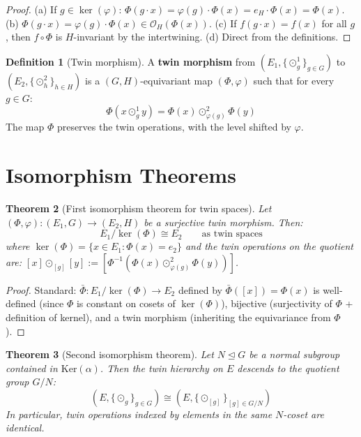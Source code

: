 \documentclass[12pt]{article}
\theoremstyle{plain}
\newtheorem{theorem}{Theorem}[section]
\theoremstyle{definition}
\newtheorem{definition}[theorem]{Definition}
\theoremstyle{remark}
\newcommand{\Ker}{\mathrm{Ker}}
\begin{document}
\begin{proof}
(a) If $g \in \ker(\varphi)$: $\Phi(g \cdot x) = \varphi(g) \cdot \Phi(x) = e_H \cdot \Phi(x) = \Phi(x)$.
(b) $\Phi(g \cdot x) = \varphi(g) \cdot \Phi(x) \in \mathcal{O}_H(\Phi(x))$.
(c) If $f(g \cdot x) = f(x)$ for all $g$, then $f \circ \Phi$ is $H$-invariant by the intertwining.
(d) Direct from the definitions.
\end{proof}

\begin{definition}[Twin morphism]\label{def:twin-morphism}
A \textbf{twin morphism} from $(E_1, \{\odot^1_g\}_{g \in G})$ to $(E_2, \{\odot^2_h\}_{h \in H})$ is a $(G,H)$-equivariant map $(\Phi, \varphi)$ such that for every $g \in G$:
\begin{equation}
\Phi(x \odot^1_g y) = \Phi(x) \odot^2_{\varphi(g)} \Phi(y)
\end{equation}
The map $\Phi$ preserves the twin operations, with the level shifted by $\varphi$.
\end{definition}


\section{Isomorphism Theorems}
\label{sec:isomorphisms}

\begin{theorem}[First isomorphism theorem for twin spaces]\label{thm:iso1}
Let $(\Phi, \varphi): (E_1, G) \to (E_2, H)$ be a surjective twin morphism. Then:
\begin{equation}
E_1 / \ker(\Phi) \cong E_2 \qquad \text{as twin spaces}
\end{equation}
where $\ker(\Phi) = \{x \in E_1 : \Phi(x) = e_2\}$ and the twin operations on the quotient are:
$[x] \odot_{[g]} [y] := [\Phi^{-1}(\Phi(x) \odot^2_{\varphi(g)} \Phi(y))]$.
\end{theorem}

\begin{proof}
Standard: $\bar\Phi: E_1/\ker(\Phi) \to E_2$ defined by $\bar\Phi([x]) = \Phi(x)$ is well-defined (since $\Phi$ is constant on cosets of $\ker(\Phi)$), bijective (surjectivity of $\Phi$ + definition of kernel), and a twin morphism (inheriting the equivariance from $\Phi$).
\end{proof}

\begin{theorem}[Second isomorphism theorem]\label{thm:iso2}
Let $N \trianglelefteq G$ be a normal subgroup contained in $\Ker(\alpha)$. Then the twin hierarchy on $E$ descends to the quotient group $G/N$:
\begin{equation}
(E, \{\odot_g\}_{g \in G}) \cong (E, \{\odot_{[g]}\}_{[g] \in G/N})
\end{equation}
In particular, twin operations indexed by elements in the same $N$-coset are identical.
\end{theorem}
\end{document}
